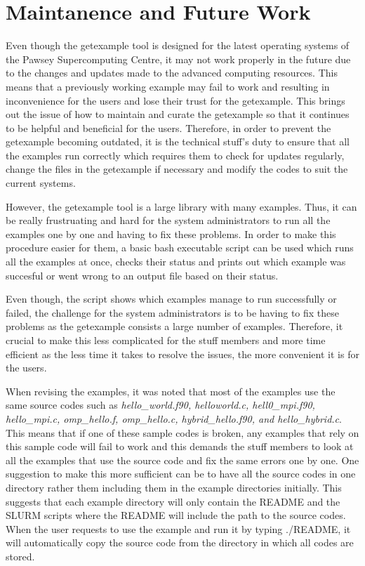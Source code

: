 \section{Maintanence and Future Work}

Even though the getexample tool is designed for the latest operating systems of the Pawsey Supercomputing Centre, it may not work properly in the future
due to the changes and updates made to the advanced computing resources. This means that a previously working example may fail to work and resulting in 
inconvenience for the users and lose their trust for the getexample. This brings out the issue of how to maintain and curate the getexample so that it 
continues to be helpful and beneficial for the users. Therefore, in order to prevent the getexample becoming outdated, it is the technical stuff's duty 
to ensure that all the examples run correctly which requires them to check for updates regularly, change the files in the getexample if necessary and 
modify the codes to suit the current systems.

However, the getexample tool is a large library with many examples. Thus, it can be really frustruating and hard for the system administrators to run 
all the examples one by one and having to fix these problems. In order to make this procedure easier for them, a basic bash executable script can be 
used which runs all the examples at once, checks their status and prints out which example was succesful or went wrong to an output file based on their
status.

Even though, the script shows which examples manage to run successfully or failed, the challenge for the system administrators is to be having to fix 
these problems as the getexample consists a large number of examples. Therefore, it crucial to make this less complicated for the stuff members and more
time efficient as the less time it takes to resolve the issues, the more convenient it is for the users. 

When revising the examples, it was noted that most of the examples use the same source codes such as \emph{hello\_world.f90, helloworld.c, 
hell0\_mpi.f90, hello\_mpi.c, omp\_hello.f, omp\_hello.c, hybrid\_hello.f90, and hello\_hybrid.c}. This means that if one of these sample codes is
broken, any examples that rely on this sample code will fail to work and this demands the stuff members to look at all the examples that use the source
code and fix the same errors one by one. One suggestion to make this more sufficient can be to have all the source codes in one directory rather them
including them in the example directories initially. This suggests that each example directory will only contain the README and the SLURM scripts where
the README will include the path to the source codes. When the user requests to use the example and run it by typing ./README, it will automatically
copy the source code from the directory in which all codes are stored.

